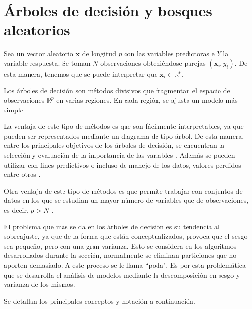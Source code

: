 \newpage
\section{ Árboles de decisión y bosques aleatorios}

\noindent Sea un vector aleatorio $\textbf{x}$ de longitud $p$ con las variables predictoras e $Y$ la variable respuesta. Se toman $N$ observaciones obteniéndose parejas $(\textbf{x}_i,y_i)$. De esta manera, tenemos que se puede interpretar que $\mathbf{x}_i\in\mathbb{R}^p$.

\noindent Los árboles de decisión son métodos divisivos que fragmentan  el espacio de observaciones $\mathbb{R}^p$ en varias regiones. En cada región, se ajusta un modelo más simple.

\noindent La ventaja de este tipo de métodos es que son fácilmente interpretables, ya que pueden ser representados mediante un diagrama de tipo árbol. De esta manera, entre los principales objetivos de los árboles de decisión, se encuentran la selección y evaluación de la importancia de las variables \cite{Brown 2004,Song 2015}. Además se pueden utilizar con fines predictivos o incluso de manejo de los datos, valores perdidos entre otros \cite{Nerini 2007}.

\noindent Otra ventaja de este tipo de métodos es que permite trabajar con conjuntos de datos en los que se estudian un mayor número de variables que de observaciones, es decir, $p > N$ \cite{Diaz 2006}. 

\noindent El problema que más se da en los árboles de decisión es su tendencia al sobreajuste, ya que de la forma que están conceptualizados, provoca que el sesgo sea pequeño, pero con una gran varianza. Esto se considera en los algoritmos desarrollados durante la sección, normalmente se eliminan particiones que no aporten demasiado. A este proceso se le llama ``poda". Es por esta problemática que se desarrolla el análisis de modelos mediante la descomposición en sesgo y varianza de los mismos. 

\noindent Se detallan los principales conceptos y notación a continuación. 

